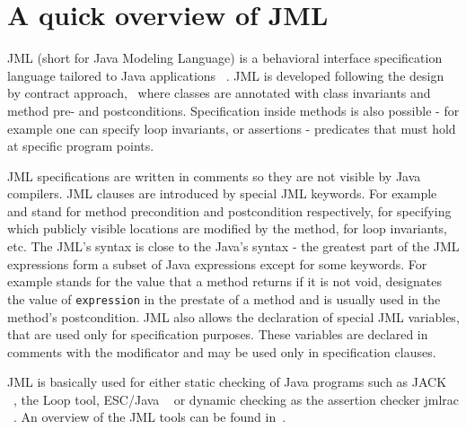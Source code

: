 \section{A quick overview of JML}\label{prelim}
JML (short for Java Modeling Language) is a behavioral interface specification language tailored to Java applications ~\cite{JMLRefMan}. JML is developed 
following the design by contract approach,~\cite{M97oos} where classes are annotated with class invariants and method pre- and postconditions. Specification
inside methods is also possible - for example one can specify loop invariants, or assertions - predicates that must hold at specific program points. 

JML specifications are written in comments so they are not visible by Java compilers. JML clauses are introduced by 
special JML keywords. For example  and  stand for method precondition and postcondition respectively,  for specifying which publicly visible locations are modified by the method,  for loop invariants, etc. The JML's syntax is close to the Java's syntax - the greatest part of the JML expressions form a subset of Java expressions except for some keywords. For example  stands for the value that a method returns if it is not void,  designates the value of \texttt{expression} in the prestate of a method and is usually used in the method's postcondition. JML also allows the declaration of special JML variables, that are used only for specification purposes. 
These variables are declared in comments with the  modificator and may be used only in specification clauses. 

JML is basically used for either static checking of Java programs such as JACK ~\cite{BR02jack}, the Loop tool, ESC/Java ~\cite{escjava} or dynamic checking as the assertion checker jmlrac ~\cite{jmlrac}. An overview of the JML tools can be found in~\cite{BurdyCCEKLLP03}.
     

